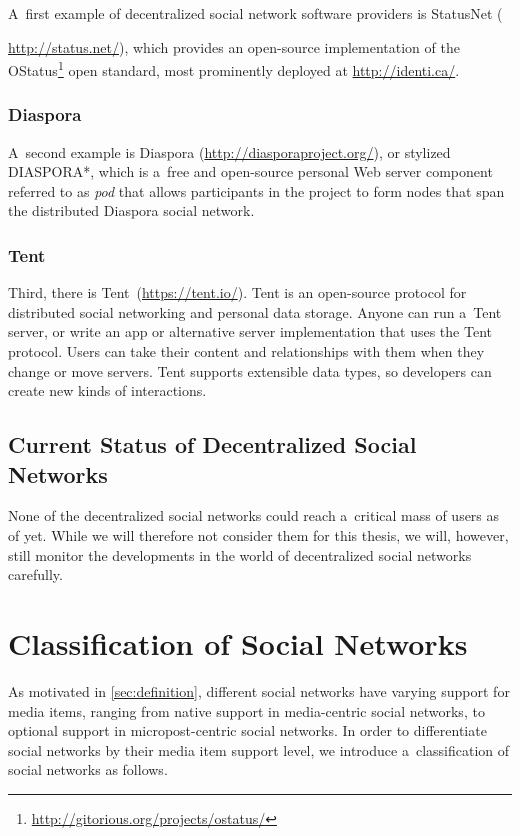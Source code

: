 A~first example of decentralized social network software providers
is StatusNet ({\url{http://status.net/}),
which provides an open-source implementation of the
OStatus\footnote{\url{http://gitorious.org/projects/ostatus/}}
open standard, most prominently deployed
at \url{http://identi.ca/}.

\subsubsection{Diaspora}

A~second example is Diaspora (\url{http://diasporaproject.org/}),
or stylized DIASPORA*,
which is a~free and open-source personal Web server component
referred to as \emph{pod} that allows
participants in the project to form nodes
that span the distributed Diaspora social network.

\subsubsection{Tent}

Third, there is Tent\texttrademark~(\url{https://tent.io/}).
Tent is an open-source protocol for distributed social networking
and personal data storage.
Anyone can run a~Tent server,
or write an app or alternative server implementation
that uses the Tent protocol.
Users can take their content and relationships with them
when they change or move servers.
Tent supports extensible data types,
so developers can create new kinds of interactions.

\subsection{Current Status of Decentralized Social Networks}

None of the decentralized social networks could reach
a~critical mass of users as of yet.
While we will therefore not consider them for this thesis,
we will, however, still monitor the developments in the world
of decentralized social networks carefully.

\section{Classification of Social Networks}
\label{sec:classification-of-social-networks}

As motivated in \autoref{sec:definition},
different social networks have varying support
for media items, ranging from native support
in media-centric social networks,
to optional support in micropost-centric social networks.
In order to differentiate social networks by their
media item support level,
we introduce a~classification of social networks as follows.

}
